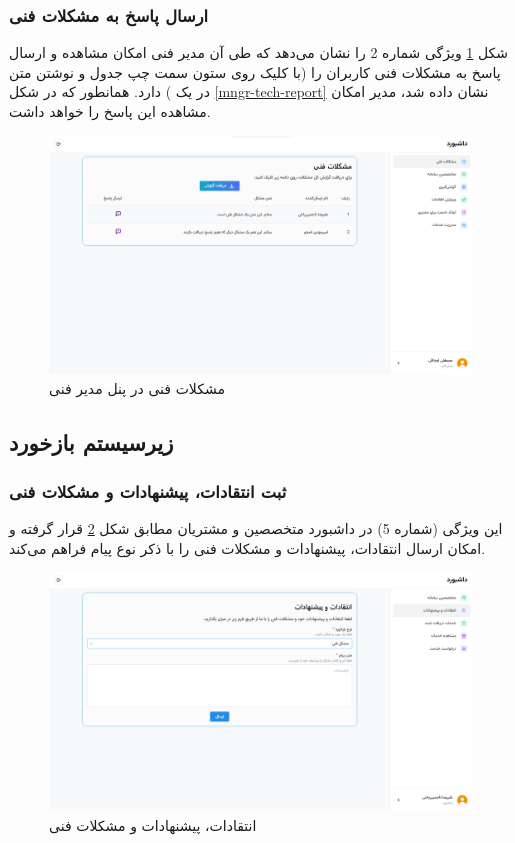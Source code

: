\subsubsection{ارسال پاسخ به مشکلات فنی}
شکل
\ref{tech-tech-report}
ویژگی شماره 2 را نشان می‌دهد که طی آن مدیر فنی امکان مشاهده و ارسال پاسخ به مشکلات فنی کاربران را (با کلیک روی ستون سمت چپ جدول و نوشتن متن در یک ) دارد. همانطور که در شکل
\ref{mngr-tech-report}
نشان داده شد، مدیر امکان مشاهده این پاسخ را خواهد داشت.

\begin{figure}[h]
	\centering
	\includegraphics[width=\textwidth]{figs/initial-ui/tech-tech-report}
	\caption{مشکلات فنی در پنل مدیر فنی}
	\label{tech-tech-report}
\end{figure}

\subsection{زیرسیستم بازخورد}

\subsubsection{ثبت انتقادات، پیشنهادات و مشکلات فنی}
این ویژگی (شماره 5) در داشبورد متخصصین و مشتریان مطابق شکل
\ref{suggestions}
قرار گرفته و امکان ارسال انتقادات، پیشنهادات و مشکلات فنی را با ذکر نوع پیام فراهم می‌کند.

\begin{figure}[h]
	\centering
	\includegraphics[width=\textwidth]{figs/initial-ui/suggestions}
	\caption{انتقادات، پیشنهادات و مشکلات فنی}
	\label{suggestions}
\end{figure}

